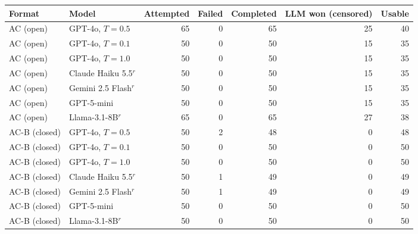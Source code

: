 \begin{tabular}{llrrrrr}
\toprule
Format & Model & Attempted & Failed & Completed & LLM won (censored) & Usable \\
\midrule
AC (open) & GPT-4o, $T=0.5$ & 65 & 0 & 65 & 25 & 40 \\
AC (open) & GPT-4o, $T=0.1$ & 50 & 0 & 50 & 15 & 35 \\
AC (open) & GPT-4o, $T=1.0$ & 50 & 0 & 50 & 15 & 35 \\
AC (open) & Claude Haiku 5.5$^{r}$ & 50 & 0 & 50 & 15 & 35 \\
AC (open) & Gemini 2.5 Flash$^{r}$ & 50 & 0 & 50 & 15 & 35 \\
AC (open) & GPT-5-mini & 50 & 0 & 50 & 15 & 35 \\
AC (open) & Llama-3.1-8B$^{r}$ & 65 & 0 & 65 & 27 & 38 \\
\midrule
AC-B (closed) & GPT-4o, $T=0.5$ & 50 & 2 & 48 & 0 & 48 \\
AC-B (closed) & GPT-4o, $T=0.1$ & 50 & 0 & 50 & 0 & 50 \\
AC-B (closed) & GPT-4o, $T=1.0$ & 50 & 0 & 50 & 0 & 50 \\
AC-B (closed) & Claude Haiku 5.5$^{r}$ & 50 & 1 & 49 & 0 & 49 \\
AC-B (closed) & Gemini 2.5 Flash$^{r}$ & 50 & 1 & 49 & 0 & 49 \\
AC-B (closed) & GPT-5-mini & 50 & 0 & 50 & 0 & 50 \\
AC-B (closed) & Llama-3.1-8B$^{r}$ & 50 & 0 & 50 & 0 & 50 \\
\bottomrule
\end{tabular}
